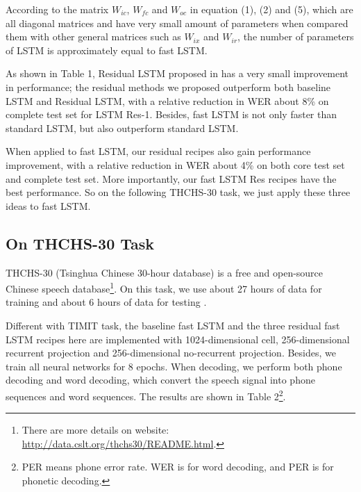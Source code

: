 \documentclass[a4paper]{article}
\begin{document}
According to the matrix $W_{ic}$, $W_{fc}$ and $W_{oc}$ in equation (1), (2) and (5), which are all diagonal matrices
and have very small amount of parameters when compared them with other general matrices such as $W_{ix}$ and $W_{ir}$,
the number of parameters of LSTM is approximately equal to fast LSTM.

As shown in Table 1, Residual LSTM proposed in \cite{residual-lstm} has a very small improvement in performance;
the residual methods we proposed outperform both baseline LSTM and Residual LSTM,
with a relative reduction in WER about 8\% on complete test set for LSTM Res-1.
Besides, fast LSTM is not only faster than standard LSTM, but also outperform  standard LSTM.

When applied to fast LSTM, our residual recipes also gain performance improvement,
with a relative reduction in WER about 4\% on both core test set and complete test set.
More importantly, our fast LSTM Res recipes have the best performance.
So on the following THCHS-30 task, we just apply these three ideas to fast LSTM.

\subsection{On THCHS-30 Task}

THCHS-30 (Tsinghua Chinese 30-hour database) is a free and open-source Chinese speech database\footnote{There are more details on website:
\url{http://data.cslt.org/thchs30/README.html}.}.
On this task, we use about 27 hours of data for training and about 6 hours of data for testing \cite{thchs30}.


Different with TIMIT task, the baseline fast LSTM and the three residual fast LSTM recipes here are implemented with 1024-dimensional cell,
256-dimensional recurrent projection and 256-dimensional no-recurrent projection.
Besides, we train all neural networks for 8 epochs.
When decoding, we perform both phone decoding and word decoding, which convert the speech signal into phone sequences and word sequences.
The results are shown in Table 2\footnote{PER means phone error rate. WER is for word decoding, and PER is for phonetic decoding.}.
\end{document}
